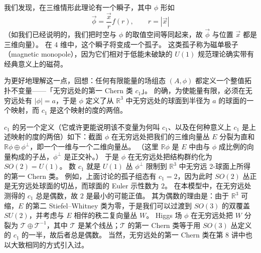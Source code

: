 我们发现，在三维情形此理论有一个瞬子，其中 $\phi$ 形如
\[
\vec\phi=\frac{\vec x}{r}f(r),\qquad r=|\vec x|
\]
（如我们已经说明的，我们把时空与 $\phi$ 的取值空间等同起来，故 $\vec\phi$ 与位置 $\vec x$ 都是三维向量）。
在 4 维中，这个瞬子将变成一个孤子。
这类孤子称为磁单极子（magnetic monopole），因为它们相对于低能未破缺的 $U(1)$ 规范理论确实带有经典意义上的磁荷。

为更好地理解这一点，回想：任何有限能量的场组态 $(A,\phi)$ 都定义一个整值拓扑不变量——「无穷远处的第一 Chern 类 $c_1$」。
的确，为使能量有限，必须在无穷远处有 $|\phi|=a$，于是 $\phi$ 定义了从 $\mathbb{R}^3$ 中无穷远处的球面到半径为 $a$ 的球面的一个映射，而 $c_1$ 是这个映射的度的两倍。

$c_1$ 的另一个定义（它或许更能说明该不变量为何叫 $c_1$、以及在何种意义上 $c_1$ 是上述映射的度的两倍）如下：截面 $\phi$ 在无穷远处把我们的三维向量丛 $E$ 分裂为直和 $\mathbb{R}\phi\oplus\phi^{\perp}$，即一个一维与一个二维向量丛。
（这里 $\mathbb{R}\phi$ 是 $E$ 中由与 $\phi$ 成比例的向量构成的子丛，$\phi^{\perp}$ 是正交补。）
于是 $\phi$ 在无穷远处把结构群约化为 $SO(2)=U(1)$。
数 $c_1$ 就是 $U(1)$ 丛 $\phi^{\perp}$ 限制到 $\mathbb{R}^3$ 中无穷远 2-球面上所得的第一 Chern 类。
例如，上面讨论的孤子组态有 $c_1=2$，因为此时 $SO(2)$ 丛正是无穷远处球面的切丛，而球面的 Euler 示性数为 $2$。
在本模型中，在无穷远处测得的 $c_1$ 总是偶数，故 $2$ 是最小的可能正值。
其为偶数的理由是：由于 $\mathbb{R}^3$ 可缩，$E$ 的第二 Stiefel–Whitney 类为零，于是我们可以过渡到 $SO(3)$ 的双覆盖 $SU(2)$，并考虑与 $E$ 相伴的秩二复向量丛 $W$。
Higgs 场 $\phi$ 在无穷远处把 $W$ 分裂为 $\mathcal{T}\oplus\mathcal{T}^{-1}$，其中 $\mathcal{T}$ 是某个线丛；$\mathcal{T}$ 的第一 Chern 类等于用 $SO(3)$ 丛定义的 $c_1$ 的一半，故后者总是偶数。
当然，无穷远处的第一 Chern 类在第 8 讲中也以大致相同的方式引入过。



